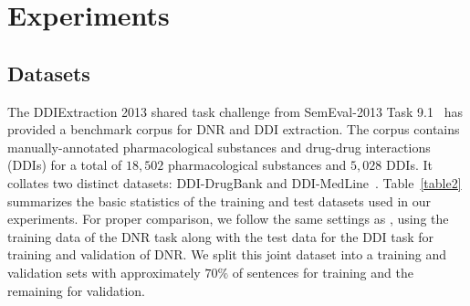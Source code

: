 \documentclass[11pt,letterpaper]{article}
\begin{document}
\begin{table*}[ht]	
	\centering
		\caption{SemEval-2013 Task 9.1 results by entity for the bidirectional LSTM-CRF.} 
	\label{table4} 
\end{table*}


\section{Experiments}

\subsection{Datasets}
The DDIExtraction 2013 shared task challenge from SemEval-2013 Task 9.1~\cite{segura2013semeval} has provided a benchmark corpus for DNR and DDI extraction. The corpus contains manually-annotated pharmacological substances and drug-drug interactions (DDIs) for a total of $18,502$ pharmacological substances and $5,028$ DDIs. It collates two distinct datasets: DDI-DrugBank and DDI-MedLine~\cite{herrero2013ddi}. Table~\ref{table2} summarizes the basic statistics of the training and test datasets used in our experiments. For proper comparison, we follow the same settings as \cite{segura2015exploring}, using the training data of the DNR task along with the test data for the DDI task for training and validation of DNR. We split this joint dataset into a training and validation sets with approximately $70\%$ of sentences for training and the remaining for validation. 
\end{document}
